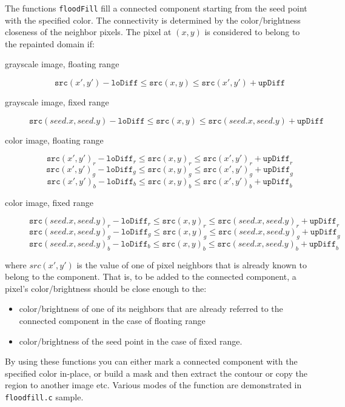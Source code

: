 The functions \texttt{floodFill} fill a connected component starting from the seed point with the specified color. The connectivity is determined by the color/brightness closeness of the neighbor pixels. The pixel at $(x,y)$ is considered to belong to the repainted domain if:

\begin{description}

\item[grayscale image, floating range] \[
\texttt{src}(x',y')-\texttt{loDiff} \leq \texttt{src}(x,y) \leq \texttt{src}(x',y')+\texttt{upDiff} \]

\item[grayscale image, fixed range] \[
\texttt{src}(seed.x,seed.y)-\texttt{loDiff}\leq \texttt{src}(x,y) \leq \texttt{src}(seed.x,seed.y)+\texttt{upDiff} \]

\item[color image, floating range]
\[ \texttt{src}(x',y')_r-\texttt{loDiff}_r\leq \texttt{src}(x,y)_r\leq \texttt{src}(x',y')_r+\texttt{upDiff}_r \]
\[ \texttt{src}(x',y')_g-\texttt{loDiff}_g\leq \texttt{src}(x,y)_g\leq \texttt{src}(x',y')_g+\texttt{upDiff}_g \]
\[ \texttt{src}(x',y')_b-\texttt{loDiff}_b\leq \texttt{src}(x,y)_b\leq \texttt{src}(x',y')_b+\texttt{upDiff}_b \]

\item[color image, fixed range]
\[ \texttt{src}(seed.x,seed.y)_r-\texttt{loDiff}_r\leq \texttt{src}(x,y)_r\leq \texttt{src}(seed.x,seed.y)_r+\texttt{upDiff}_r \]
\[ \texttt{src}(seed.x,seed.y)_g-\texttt{loDiff}_g\leq \texttt{src}(x,y)_g\leq \texttt{src}(seed.x,seed.y)_g+\texttt{upDiff}_g \]
\[ \texttt{src}(seed.x,seed.y)_b-\texttt{loDiff}_b\leq \texttt{src}(x,y)_b\leq \texttt{src}(seed.x,seed.y)_b+\texttt{upDiff}_b \]
\end{description}

where $src(x',y')$ is the value of one of pixel neighbors that is already known to belong to the component. That is, to be added to the connected component, a pixel's color/brightness should be close enough to the:
\begin{itemize}
  \item color/brightness of one of its neighbors that are already referred to the connected component in the case of floating range
  \item color/brightness of the seed point in the case of fixed range.
\end{itemize}

By using these functions you can either mark a connected component with the specified color in-place, or build a mask and then extract the contour or copy the region to another image etc. Various modes of the function are demonstrated in \texttt{floodfill.c} sample.

